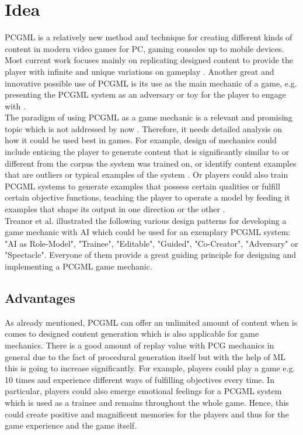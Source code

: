 \documentclass[MGS,Master,english]{twbook}%
\begin{document}
\section{Idea}
\ac{PCGML} is a relatively new method and technique for creating different kinds of content in modern video games  for \ac{PC}, gaming consoles up to mobile devices. Most current work focuses mainly on replicating designed content to provide the player with infinite and unique variations on gameplay \cite{pcgml::paper}. Another great and innovative possible use of PCGML is its use as the main mechanic of a game, e.g. presenting the \ac{PCGML} system as an adversary or toy for the player to engage with \cite{pcgml::paper}. \\
The paradigm of using \ac{PCGML} as a game mechanic is a relevant and promising topic which is not addressed by now \cite{pcgml::paper}. Therefore, it needs detailed analysis on how it could be used best in games. For example, design of mechanics could include enticing the player to generate content that is significantly similar to or different from the corpus the system was trained on, or identify content examples that are outliers or typical examples of the system \cite{pcgml::paper}. Or players could also train \ac{PCGML} systems to generate examples that possess certain qualities or fulfill certain objective functions, teaching the player to operate a model by feeding it examples that shape its output in one direction or the other \cite{pcgml::paper}. \\ 
Treanor et al. \cite{ai::aiBasedGameDesignPattern} illustrated the following various design patterns for developing a game mechanic with \ac{AI} which could be used for an exemplary PCGML system: "\ac{AI} as Role-Model", "Trainee", "Editable", "Guided", "Co-Creator", "Adversary" or "Spectacle". Everyone of them provide a great guiding principle for designing and implementing a PCGML game mechanic.

\subsection{Advantages}
As already mentioned, PCGML can offer an unlimited amount of content when is comes to designed content generation which is also applicable for game mechanics. There is a good amount of replay value with PCG mechanics in general due to the fact of procedural generation itself but with the help of ML this is going to increase significantly. For example, players could play a game e.g. 10 times and experience different ways of fulfilling objectives every time. In particular, players could also emerge emotional feelings for a PCGML system which is used as a trainee and remains throughout the whole game. Hence, this could create positive and magnificent memories for the players and thus for the game experience and the game itself.
\end{document}
